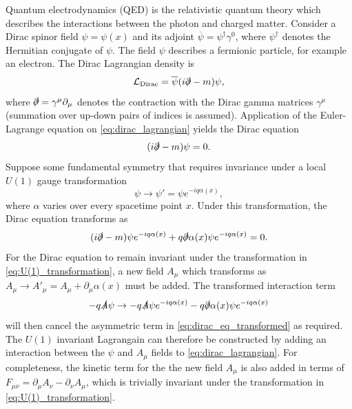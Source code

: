 Quantum electrodynamics (QED) is the relativistic quantum theory which describes the interactions between the photon and charged matter.
Consider a Dirac spinor field $\psi = \psi(x)$ and its adjoint $\overline{\psi} = \psi^\dagger \gamma^0$, where $\psi^\dagger$ denotes the Hermitian conjugate of $\psi$.
The field $\psi$ describes a fermionic \spinhalf particle, for example an electron.
The Dirac Lagrangian density is
%
\begin{equation}\label{eq:dirac_lagrangian}
  \mathcal{L}_{\textnormal{Dirac}} = \overline{\psi} (i \slashed{\partial}  - m )\psi,
\end{equation}
%
where $\slashed{\partial} = \gamma^\mu \partial_\mu$ denotes the contraction with the Dirac gamma matrices $\gamma^\mu$ (summation over up-down pairs of indices is assumed).
Application of the Euler-Lagrange equation on \cref{eq:dirac_lagrangian} yields the Dirac equation
%
\begin{equation}\label{eq:dirac_eq}
  (i \slashed{\partial}  - m )\psi = 0 .
\end{equation}
%
Suppose some fundamental symmetry that requires invariance under a local $U(1)$ gauge transformation
%
\begin{equation}\label{eq:U(1)_transformation}
  \psi \rightarrow \psi' = \psi e^{- i q \alpha(x)} ,
\end{equation}
%
where $\alpha$ varies over every spacetime point $x$.
Under this transformation, the Dirac equation transforms as 
%
\begin{equation}\label{eq:dirac_eq_transformed}
  (i \slashed{\partial} - m ) \psi e^{- i q \alpha(x)} + q \slashed{\partial}\alpha(x) \psi e^{- i q \alpha(x)} = 0.
\end{equation}
%
For the Dirac equation to remain invariant under the transformation in \cref{eq:U(1)_transformation}, a new field $A_\mu$ which transforms as $A_\mu \rightarrow A'_\mu = A_\mu + \partial_\mu \alpha(x)$ must be added.
The transformed interaction term
%
\begin{equation}
  - q \slashed{A} \psi \rightarrow - q \slashed{A} \psi e^{- i q \alpha(x)} - q \slashed{\partial} \alpha(x) \psi e^{- i q \alpha(x)}
\end{equation}
%
will then cancel the asymmetric term in \cref{eq:dirac_eq_transformed} as required.
The $U(1)$ invariant Lagrangain can therefore be constructed by adding an interaction between the $\psi$ and $A_\mu$ fields to \cref{eq:dirac_lagrangian}. For completeness, the kinetic term for the the new field $A_\mu$ is also added in terms of $F_{\mu\nu} = \partial_\mu A_\nu - \partial_\nu A_\mu$, which is trivially invariant under the transformation in \cref{eq:U(1)_transformation}.
